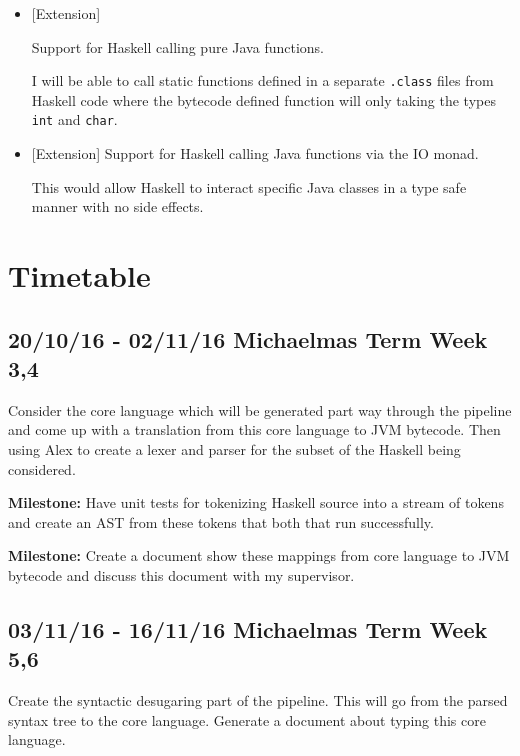 \documentclass[a4paper]{article}
\begin{document}
\begin{itemize}
    \item

      [Extension]

      Support for Haskell calling pure Java functions.

      I will be able to call static functions defined in a separate \texttt{.class} files from Haskell code where the bytecode defined function will
      only taking the types \texttt{int} and \texttt{char}.

    \item

      [Extension] Support for Haskell calling Java functions via the IO monad.

      This would allow Haskell to interact specific Java classes in a type safe manner with no side effects.

  \end{itemize}

  \section*{Timetable}


    \subsection*{20/10/16 - 02/11/16 \hfill Michaelmas Term Week 3,4}

      Consider the core language which will be generated part way through the pipeline and come up with
      a translation from this core language to JVM bytecode.
      Then using Alex to create a lexer and parser for the subset of the Haskell being considered.


      \textbf{Milestone:} Have unit tests for tokenizing Haskell source into a stream of tokens and create an AST from these tokens that both that run successfully.

      \textbf{Milestone:}
      Create a document show these mappings from core language to JVM bytecode and discuss this document with my supervisor.


    \subsection*{03/11/16 - 16/11/16 \hfill Michaelmas Term Week 5,6}


      Create the syntactic desugaring part of the pipeline. This will go from the parsed syntax tree to the core language.
      Generate a document about typing this core language.
     
\end{document}
